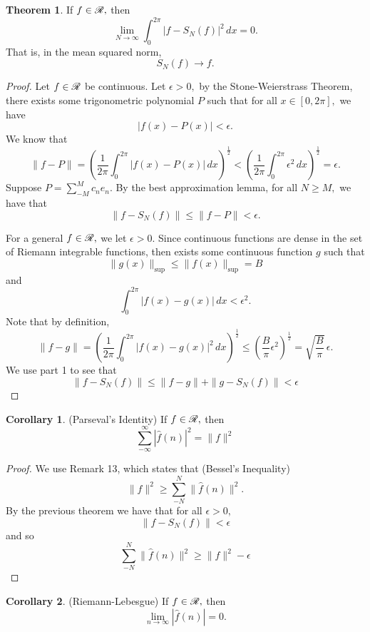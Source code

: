 \documentclass[10pt, oneside]{article}
\theoremstyle{definition}
\newtheorem{thm}{Theorem}
\newtheorem{cor}{Corollary}
\begin{document}
\begin{thm}
    If $f\in \cal R,$  then 
    \[\lim_{N\to \infty}\int_0^{2\pi} |f - S_N(f)|^2\, dx = 0.\] That is, in the mean squared norm, 
    \[S_N(f) \to f.\]
\end{thm}
\begin{proof}
    Let $f\in \cal R$ be continuous. Let $\epsilon>0,$ by the Stone-Weierstrass Theorem, there exists some trigonometric polynomial $P$ such that for all $x\in [0, 2\pi],$ we have
    \[|f(x) - P(x)|< \epsilon.\] We know that 
    \[\|f - P\| = \left(\frac{1}{2\pi}\int_0^{2\pi} |f(x) - P(x)|\, dx\right)^{\frac{1}{2}} < \left(\frac{1}{2\pi}\int_0^{2\pi} \epsilon^2 \, dx\right)^\frac{1}{2}  = \epsilon.\] Suppose $P = \sum_{-M}^M c_ne_n.$ By the best approximation lemma, for all $N\geq M,$ we have that 
    \[\|f - S_N(f)\| \leq \|f - P\|  < \epsilon.\]

    For a general $f\in \cal R,$ we let $\epsilon>0.$ Since continuous functions are dense in the set of Riemann integrable functions, then exists some continuous function $g$ such that 
    \[\|g(x)\|_{\sup} \leq \|f(x)\|_{\sup} = B\] and 
    \[\int_0^{2\pi} |f(x) - g(x)|\, dx  < \epsilon^2.\] Note that by definition,
    \[\|f - g\| = \left(\frac{1}{2\pi}\int_0^{2\pi} |f(x) - g(x)|^2\, dx\right)^\frac{1}{2} \leq  \left(\frac{B}{\pi}\epsilon^2\right)^\frac{1}{2}  = \sqrt{\frac{B}{\pi}}\,\epsilon.\] We use part 1 to see that 
    \[\|f - S_N(f)\| \leq \|f  - g\| + \|g - S_N(f)\| < \epsilon\]
\end{proof}
\begin{cor}
    (Parseval's Identity) If $f\in \cal R,$ then 
    \[\sum_{-\infty}^\infty |\hat{f}(n)|^2 = \|f\|^2\]
\end{cor}
\begin{proof}
    We use Remark 13, which states that (Bessel's Inequality)
    \[\|f\|^2 \geq \sum_{-N}^N \|\hat{f}(n)\|^2.\] By the previous theorem we have that for all $\epsilon>0,$
    \[\|f - S_N(f)\|< \epsilon\] and so 
    \[\sum_{-N}^N \|\hat{f}(n)\|^2 \geq \|f\|^2 - \epsilon\]
\end{proof}
\begin{cor}
    (Riemann-Lebesgue) If $f\in \cal R,$ then 
    \[\lim_{n\to \infty}|\hat{f}(n)|  = 0.\]
\end{cor}
    
\newpage
\end{document}
